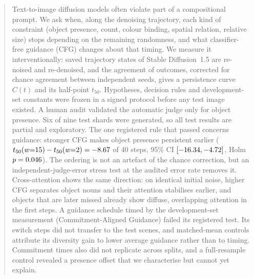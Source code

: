 \begin{abstract}
Text-to-image diffusion models often violate part of a compositional prompt. We ask when, along the denoising trajectory, each kind of constraint (object presence, count, colour binding, spatial relation, relative size) stops depending on the remaining randomness, and what classifier-free guidance (CFG) changes about that timing. We measure it interventionally: saved trajectory states of Stable Diffusion~1.5 are re-noised and re-denoised, and the agreement of outcomes, corrected for chance agreement between independent seeds, gives a persistence curve $C(t)$ and its half-point $t_{50}$. Hypotheses, decision rules and development-set constants were frozen in a signed protocol before any test image existed. A human audit validated the automatic judge only for object presence.
Six of nine test shards were generated, so all test results are partial and exploratory. The one registered rule that passed concerns guidance: stronger CFG makes object presence persistent earlier ($t_{50}(w{=}15)-t_{50}(w{=}2)=\rbHdReg$ of 40 steps, 95\% CI $[\rbHdRegLo,\rbHdRegHi]$, Holm $p=\rbHdHolm$). The ordering is not an artefact of the chance correction, but an independent-judge-error stress test at the audited error rate removes it. Cross-attention shows the same direction: on identical initial noise, higher CFG separates object nouns and their attention stabilises earlier, and objects that are later missed already show diffuse, overlapping attention in the first steps. A guidance schedule timed by the development-set measurement (Commitment-Aligned Guidance) failed its registered test. Its switch steps did not transfer to the test scenes, and matched-mean controls attribute its diversity gain to lower average guidance rather than to timing. Commitment times also did not replicate across splits, and a full-resample control revealed a presence offset that we characterise but cannot yet explain.
\end{abstract}
